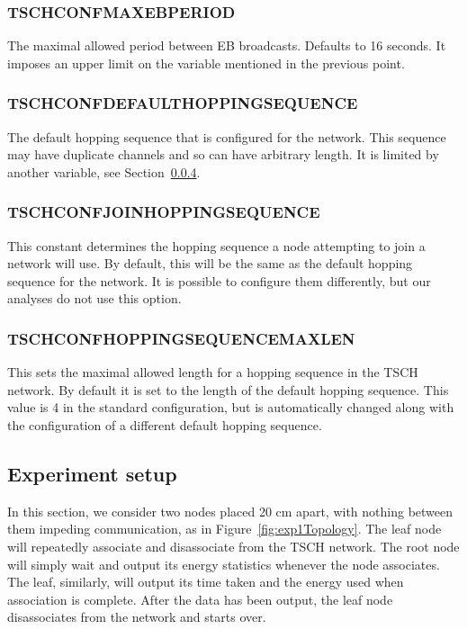 \documentclass[conference]{IEEEtran}
\newcommand{\figref}[1]{Figure~\ref{#1}}
\newcommand{\secref}[1]{Section~\ref{#1}}
\renewcommand\_{\textunderscore\allowbreak}
\begin{document}
\subsubsection{TSCH\_CONF\_MAX\_EB\_PERIOD} 

The maximal allowed period between EB broadcasts. Defaults to 16 seconds. It imposes an upper limit on the variable mentioned in the previous point.


\subsubsection{TSCH\_CONF\_DEFAULT\_HOPPING\_SEQUENCE}
The default hopping sequence that is configured for the network. This sequence may have duplicate channels and so can have arbitrary length. It is limited by another variable, see \secref{t2_maxlen}.

\subsubsection{TSCH\_CONF\_JOIN\_HOPPING\_SEQUENCE}
This constant determines the hopping sequence a node attempting to join a network will use. By default, this will be the same as the default hopping sequence for the network. It is possible to configure them differently, but our analyses do not use this option.

\subsubsection{TSCH\_CONF\_HOPPING\_SEQUENCE\_MAX\_LEN}
\label{t2_maxlen}
This sets the maximal allowed length for a hopping sequence in the TSCH network. By default it is set to the length of the default hopping sequence. This value is 4 in the standard configuration, but is automatically changed along with the configuration of a different default hopping sequence.

\subsection{Experiment setup}

In this section, we consider two nodes placed 20 cm apart, with nothing between them impeding communication, as in \figref{fig:exp1Topology}. The leaf node will repeatedly associate and disassociate from the TSCH network. The root node will simply wait and output its energy statistics whenever the node associates. The leaf, similarly, will output its time taken and the energy used when association is complete. After the data has been output, the leaf node disassociates from the network and starts over.
\end{document}
